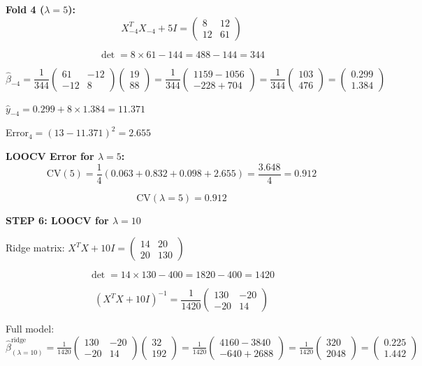 \documentclass[12pt]{article}
\begin{document}
\begin{solution}
\textbf{Fold 4 ($\lambda = 5$):}
\[X_{-4}^TX_{-4} + 5I = \begin{pmatrix} 8 & 12 \\ 12 & 61 \end{pmatrix}\]

\[\det = 8 \times 61 - 144 = 488 - 144 = 344\]

\[\hat{\beta}_{-4} = \frac{1}{344}\begin{pmatrix} 61 & -12 \\ -12 & 8 \end{pmatrix}\begin{pmatrix} 19 \\ 88 \end{pmatrix} = \frac{1}{344}\begin{pmatrix} 1159 - 1056 \\ -228 + 704 \end{pmatrix} = \frac{1}{344}\begin{pmatrix} 103 \\ 476 \end{pmatrix} = \begin{pmatrix} 0.299 \\ 1.384 \end{pmatrix}\]

$\hat{y}_{-4} = 0.299 + 8 \times 1.384 = 11.371$

Error$_4 = (13 - 11.371)^2 = 2.655$

\textbf{LOOCV Error for $\lambda = 5$:}
\[\text{CV}(5) = \frac{1}{4}(0.063 + 0.832 + 0.098 + 2.655) = \frac{3.648}{4} = 0.912\]

\[\boxed{\text{CV}(\lambda = 5) = 0.912}\]

\textbf{STEP 6: LOOCV for $\lambda = 10$}

Ridge matrix: $X^TX + 10I = \begin{pmatrix} 14 & 20 \\ 20 & 130 \end{pmatrix}$

\[\det = 14 \times 130 - 400 = 1820 - 400 = 1420\]

\[(X^TX + 10I)^{-1} = \frac{1}{1420}\begin{pmatrix} 130 & -20 \\ -20 & 14 \end{pmatrix}\]

Full model: $\hat{\beta}^{\text{ridge}}_{(\lambda=10)} = \frac{1}{1420}\begin{pmatrix} 130 & -20 \\ -20 & 14 \end{pmatrix}\begin{pmatrix} 32 \\ 192 \end{pmatrix} = \frac{1}{1420}\begin{pmatrix} 4160 - 3840 \\ -640 + 2688 \end{pmatrix} = \frac{1}{1420}\begin{pmatrix} 320 \\ 2048 \end{pmatrix} = \begin{pmatrix} 0.225 \\ 1.442 \end{pmatrix}$


\end{solution}
\end{document}
